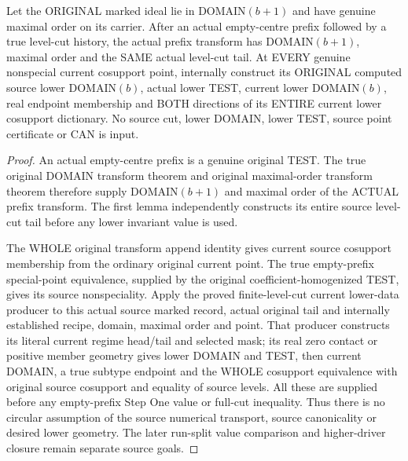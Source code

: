 \begin{theorem}
\label{hir:original-empty-prefix-current-source-lower-data}
\leanok
Let the ORIGINAL marked ideal lie in DOMAIN$(b+1)$ and have genuine maximal
order on its carrier. After an actual empty-centre prefix followed by a
true level-cut history, the actual prefix transform has DOMAIN$(b+1)$,
maximal order and the SAME actual level-cut tail. At EVERY genuine
nonspecial current cosupport point, internally construct its ORIGINAL
computed source lower DOMAIN$(b)$, actual lower TEST, current lower
DOMAIN$(b)$, real endpoint membership and BOTH directions of its ENTIRE
current lower cosupport dictionary. No source cut, lower DOMAIN, lower
TEST, source point certificate or CAN is input.
\end{theorem}
\begin{proof}
An actual empty-centre prefix is a genuine original TEST. The true original
DOMAIN transform theorem and original maximal-order transform theorem
therefore supply DOMAIN$(b+1)$ and maximal order of the ACTUAL prefix
transform. The first lemma independently constructs its entire source
level-cut tail before any lower invariant value is used.

The WHOLE original transform append identity gives current source
cosupport membership from the ordinary original current point. The true
empty-prefix special-point equivalence, supplied by the original
coefficient-homogenized TEST, gives its source nonspeciality. Apply the
proved finite-level-cut current lower-data producer to this actual source
marked record, actual original tail and internally established recipe,
domain, maximal order and point. That producer constructs its literal
current regime head/tail and selected mask; its real zero contact or
positive member geometry gives lower DOMAIN and TEST, then current
DOMAIN, a true subtype endpoint and the WHOLE cosupport equivalence with
original source cosupport and equality of source levels. All these are
supplied before any empty-prefix Step One value or full-cut inequality.
Thus there is no circular assumption of the source numerical transport,
source canonicality or desired lower geometry. The later run-split value
comparison and higher-driver closure remain separate source goals.
\end{proof}
